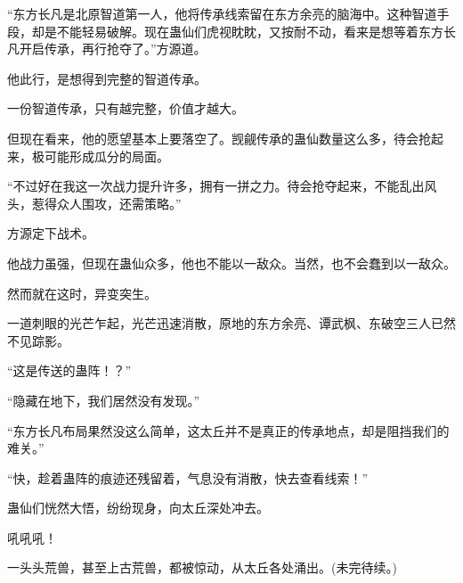 \begin{this_body}
“东方长凡是北原智道第一人，他将传承线索留在东方余亮的脑海中。这种智道手段，却是不能轻易破解。现在蛊仙们虎视眈眈，又按耐不动，看来是想等着东方长凡开启传承，再行抢夺了。”方源道。

他此行，是想得到完整的智道传承。

一份智道传承，只有越完整，价值才越大。

但现在看来，他的愿望基本上要落空了。觊觎传承的蛊仙数量这么多，待会抢起来，极可能形成瓜分的局面。

“不过好在我这一次战力提升许多，拥有一拼之力。待会抢夺起来，不能乱出风头，惹得众人围攻，还需策略。”

方源定下战术。

他战力虽强，但现在蛊仙众多，他也不能以一敌众。当然，也不会蠢到以一敌众。

然而就在这时，异变突生。

一道刺眼的光芒乍起，光芒迅速消散，原地的东方余亮、谭武枫、东破空三人已然不见踪影。

“这是传送的蛊阵！？”

“隐藏在地下，我们居然没有发现。”

“东方长凡布局果然没这么简单，这太丘并不是真正的传承地点，却是阻挡我们的难关。”

“快，趁着蛊阵的痕迹还残留着，气息没有消散，快去查看线索！”

蛊仙们恍然大悟，纷纷现身，向太丘深处冲去。

吼吼吼！

一头头荒兽，甚至上古荒兽，都被惊动，从太丘各处涌出。(未完待续。)

\end{this_body}

